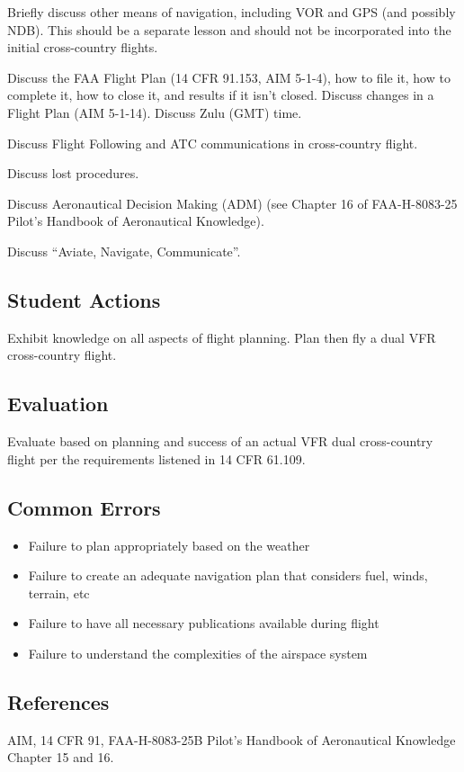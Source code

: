 Briefly discuss other means of navigation, including VOR and GPS (and possibly
NDB). This should be a separate lesson and should not be incorporated into the
initial cross-country flights.

Discuss the FAA Flight Plan (14 CFR 91.153, AIM 5-1-4), how to file it, how to
complete it, how to close it, and results if it isn't closed. Discuss changes
in a Flight Plan (AIM 5-1-14). Discuss Zulu (GMT) time.

Discuss Flight Following and ATC communications in cross-country flight.

Discuss lost procedures.

Discuss Aeronautical Decision Making (ADM) (see Chapter 16 of FAA-H-8083-25
Pilot's Handbook of Aeronautical Knowledge).

Discuss ``Aviate, Navigate, Communicate''.

\subsection{Student Actions}

Exhibit knowledge on all aspects of flight planning. Plan then fly a dual VFR
cross-country flight.

\subsection{Evaluation}

Evaluate based on planning and success of an actual VFR dual cross-country
flight per the requirements listened in 14 CFR 61.109.

\subsection{Common Errors}

\begin{itemize}
  \item Failure to plan appropriately based on the weather
  \item Failure to create an adequate navigation plan that considers fuel,
    winds, terrain, etc
  \item Failure to have all necessary publications available during flight
  \item Failure to understand the complexities of the airspace system
\end{itemize}

\subsection{References}

AIM, 14 CFR 91, FAA-H-8083-25B Pilot's Handbook of Aeronautical Knowledge
Chapter 15 and 16.

